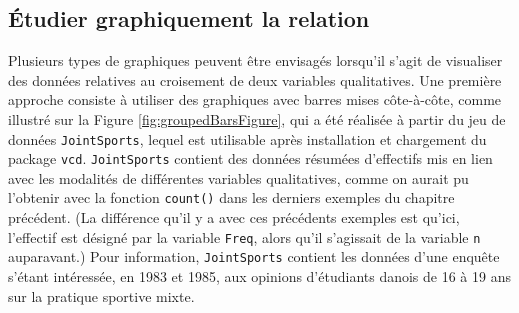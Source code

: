 \documentclass[
  french,
]{book}
\begin{document}
\hypertarget{uxe9tudier-graphiquement-la-relation-1}{%
\subsection{Étudier graphiquement la relation}\label{uxe9tudier-graphiquement-la-relation-1}}

Plusieurs types de graphiques peuvent être envisagés lorsqu'il s'agit de visualiser des données relatives au croisement de deux variables qualitatives. Une première approche consiste à utiliser des graphiques avec barres mises côte-à-côte, comme illustré sur la Figure \ref{fig:groupedBarsFigure}, qui a été réalisée à partir du jeu de données \texttt{JointSports}, lequel est utilisable après installation et chargement du package \texttt{vcd}. \texttt{JointSports} contient des données résumées d'effectifs mis en lien avec les modalités de différentes variables qualitatives, comme on aurait pu l'obtenir avec la fonction \texttt{count()} dans les derniers exemples du chapitre précédent. (La différence qu'il y a avec ces précédents exemples est qu'ici, l'effectif est désigné par la variable \texttt{Freq}, alors qu'il s'agissait de la variable \texttt{n} auparavant.) Pour information, \texttt{JointSports} contient les données d'une enquête s'étant intéressée, en 1983 et 1985, aux opinions d'étudiants danois de 16 à 19 ans sur la pratique sportive mixte.
\end{document}
